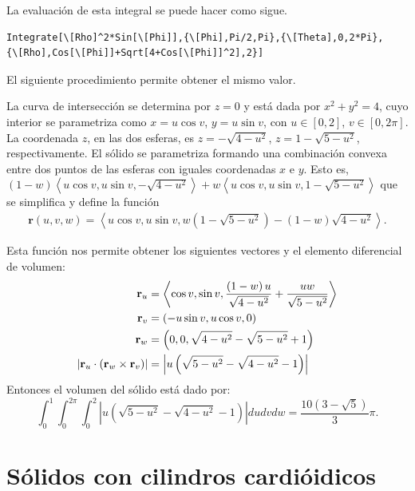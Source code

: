 La evaluación de esta integral se puede hacer como sigue.

\begin{tcolorbox}[title=\bf Instrucción en \verb"Mathematica"]\begin{Verbatim}[formatcom=\letraverbatim]
Integrate[\[Rho]^2*Sin[\[Phi]],{\[Phi],Pi/2,Pi},{\[Theta],0,2*Pi},
{\[Rho],Cos[\[Phi]]+Sqrt[4+Cos[\[Phi]]^2],2}]
\end{Verbatim}
\end{tcolorbox}

El siguiente procedimiento permite obtener el mismo valor.

La curva de intersección se determina por $z=0$ y está dada por $x^{2}+y^{2}=4$, cuyo interior se parametriza como
$x=u\cos v$, $y=u\sin v$, con $u\in [0,2]$, $v\in [0,2\pi ]$.
La coordenada $z$, en las dos esferas, es
$z= -\sqrt{4-u^{2}}$, $z= 1-\sqrt{5-u^{2}}$, respectivamente.
El sólido se parametriza formando una combinación convexa entre dos puntos de las esferas con iguales coordenadas $x$ e $y$. Esto es,
$(1-w) \left\langle u\cos v,u\sin v,-\sqrt{4-u^{2}}\right\rangle +w\left\langle u\cos v,u\sin v,1-\sqrt{5-u^{2}}\right\rangle$
que se simplifica y define la función
\begin{gather*}
\mathbf{r}(u,v,w)=\left\langle u\cos v,u\sin v,w\left(1-\sqrt{5-u^{2}}\right)-(1-w)\sqrt{4-u^{2}}\right\rangle.
\end{gather*}

Esta función nos permite obtener los siguientes vectores y el elemento diferencial de volumen:
\begin{align*}
{\bf r}_{u} &= \left\langle \cos v,\sin v,\frac{\left( 1-w\right) u}{\sqrt{4-u^{2}}}+\frac{uw}{\sqrt{5-u^{2}}} \right\rangle \\
{\bf r}_{v} &= \left( -u\sin v,u\cos v,0\right) \\
{\bf r}_{w} &= \left( 0,0,\sqrt{4-u^{2}}-\sqrt{5-u^{2}}+1\right) \\
\left\vert {\bf r}_{u}\cdot \left({\bf r}_{w}\times {\bf r}_{v}\right) \right\vert
&= \left|u\left( \sqrt{5-u^{2}}-\sqrt{4-u^{2}}-1\right) \right |
\end{align*}
Entonces el volumen del sólido está dado por:
\[\int_{0}^{1}\int_{0}^{2\pi }\int_{0}^{2}\left\vert u\left( \sqrt{5-u^{2}}-
\sqrt{4-u^{2}}-1\right)\right\vert dudvdw=\frac{10(3-\sqrt{5})}{3}\pi.\]

\section{Sólidos con cilindros cardióidicos} 

